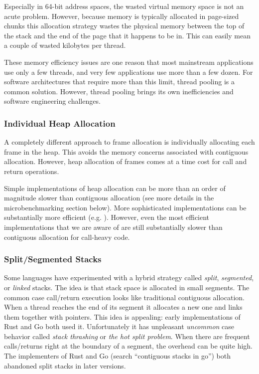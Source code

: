 \documentclass[preprint, 10pt, numbers]{sigplanconf}
\begin{document}
Especially in 64-bit address spaces, the wasted virtual memory space is not an acute problem.
However, because memory is typically allocated in page-sized chunks this allocation strategy wastes the physical memory between the top of the stack and the end of the page that it happens to be in.
This can easily mean a couple of wasted kilobytes per thread.

These memory efficiency issues are one reason that most mainstream applications use only a few threads, and very few applications use more than a few dozen.
For software architectures that require more than this limit, thread pooling is a common solution.
However, thread pooling brings its own inefficiencies and software engineering challenges.

\subsubsection{Individual Heap Allocation}

A completely different approach to frame allocation is individually allocating each frame in the heap.
This avoids the memory concerns associated with contiguous allocation.
However, heap allocation of frames comes at a time cost for call and return operations.

Simple implementations of heap allocation can be more than an order of magnitude slower than contiguous allocation (see more details in the microbenchmarking section below).
More sophisticated implementations can be substantially more efficient (e.g. \cite{Shao2000}).
However, even the most efficient implementations that we are aware of are still substantially slower than contiguous allocation for call-heavy code.

\subsubsection{Split/Segmented Stacks}

Some languages have experimented with a hybrid strategy called \emph{split}, \emph{segmented}, or \emph{linked} stacks.
The idea is that stack space is allocated in small segments.
The common case call/return execution looks like traditional contiguous allocation.
When a thread reaches the end of its segment it allocates a new one and links them together with pointers.
This idea is appealing: early implementations of Rust and Go both used it.
Unfortunately it has unpleasant \emph{uncommon} case behavior called \emph{stack thrashing} or \emph{the hot split problem}.
When there are frequent calls/returns right at the boundary of a segment, the overhead can be quite high.
The implementers of Rust \cite{Anderson2013} and Go (search ``contiguous stacks in go'') both abandoned split stacks in later versions.
\end{document}
